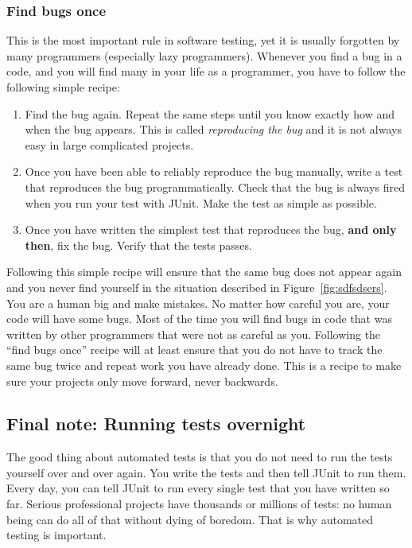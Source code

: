 \subsubsection{Find bugs once}
\label{sec:find-bugs-once}

This is the most important rule in software testing, yet it is usually
forgotten by many programmers (especially lazy programmers). Whenever
you find a bug in a code, and you will find many in your life as a
programmer, you have to follow the following simple recipe: 

\begin{enumerate}
\item Find the bug again. Repeat the same steps until you know exactly
  how and when the bug appears. This is called
  \emph{reproducing the bug} and it is not always easy in large
  complicated projects.
\item Once you have been able to reliably reproduce the bug manually,
  write a test that reproduces the bug programmatically. Check that
  the bug is always fired when you run your test with JUnit. Make the
  test as simple as possible.
\item Once you have written the simplest test that reproduces the bug,
  \textbf{and only then}, fix the bug. Verify that the tests passes. 
\end{enumerate}

Following this simple recipe will ensure that the same bug does not
appear again and you never find yourself in the situation described in
Figure~\ref{fig:sdfsdsers}. You are a human big and make mistakes. No
matter how careful you are, your code will have some bugs. Most of the
time you will find bugs in code that was written by other programmers
that were not as careful as you. Following the ``find bugs once''
recipe will at least ensure that you do not have to track the same bug
twice and repeat work you have already done. This is a recipe to make
sure your projects only move forward, never backwards. 

\subsection*{Final note: Running tests overnight}
\label{sec:runn-tests-overn}

The good thing about automated tests is that you do not need to run
the tests yourself over and over again. You write the tests and then
tell JUnit to run them. Every day, you can tell JUnit to run every
single test that you have written so far. Serious professional
projects have thousands or millions of tests: no human being can do
all of that without dying of boredom. That is why automated testing is
important. 


